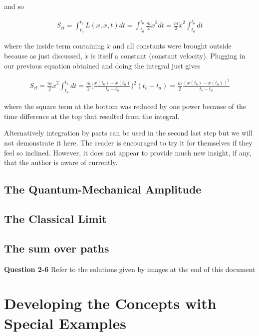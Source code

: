 \documentclass{article}
\begin{document}
and so 

\begin{align*}
    S_{cl} = \int_{t_{a}}^{t_{b}} L(x,\dot{x},t) dt = \int_{t_{a}}^{t_{b}} \frac{m}{2}\dot{x}^2 dt = \frac{m}{2}\dot{x}^2\int_{t_{a}}^{t_{b}} dt
\end{align*}

where the inside term containing $\dot{x}$ and all constants were brought outside because as just discussed, $\dot{x}$ is itself a constant (constant velocity). Plugging in our previous equation obtained and doing the integral just gives 

\begin{align*}
    S_{cl} = \frac{m}{2}\dot{x}^2\int_{t_{a}}^{t_{b}} dt = \frac{m}{2}\Big( \frac{x(t_{b}) - x(t_{a})}{t_{b} - t_{a}} \Big)^{2} (t_{b} - t_{a}) = \frac{m}{2}\frac{(x(t_{b}) - x(t_{a}))^{2} }{t_{b} - t_{a}}
\end{align*}

where the square term at the bottom was reduced by one power because of the time difference at the top that resulted from the integral. 

Alternatively integration by parts can be used in the second last step but we will not demonstrate it here. The reader is encouraged to try it for themselves if they feel so inclined. However, it does not appear to provide much new insight, if any, that the author is aware of currently. 

\subsection{The Quantum-Mechanical Amplitude}

\subsection{The Classical Limit}



\subsection{The sum over paths}
\textbf{Question 2-6} Refer to the solutions given by images at the end of this document 


\section{Developing the Concepts with Special Examples}
\end{document}
